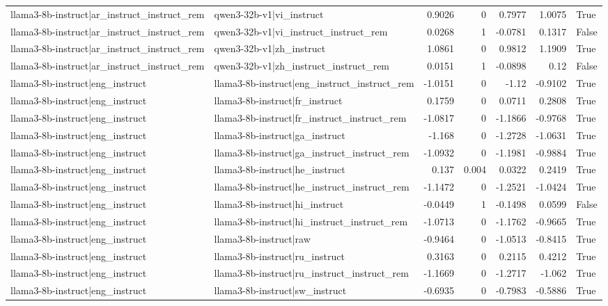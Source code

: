 \begin{table}
\begin{tabular}{l l r r r r l}
llama3-8b-instruct|ar_instruct_instruct_rem & qwen3-32b-v1|vi_instruct & 0.9026 & 0 & 0.7977 & 1.0075 & True \\
llama3-8b-instruct|ar_instruct_instruct_rem & qwen3-32b-v1|vi_instruct_instruct_rem & 0.0268 & 1 & -0.0781 & 0.1317 & False \\
llama3-8b-instruct|ar_instruct_instruct_rem & qwen3-32b-v1|zh_instruct & 1.0861 & 0 & 0.9812 & 1.1909 & True \\
llama3-8b-instruct|ar_instruct_instruct_rem & qwen3-32b-v1|zh_instruct_instruct_rem & 0.0151 & 1 & -0.0898 & 0.12 & False \\
llama3-8b-instruct|eng_instruct & llama3-8b-instruct|eng_instruct_instruct_rem & -1.0151 & 0 & -1.12 & -0.9102 & True \\
llama3-8b-instruct|eng_instruct & llama3-8b-instruct|fr_instruct & 0.1759 & 0 & 0.0711 & 0.2808 & True \\
llama3-8b-instruct|eng_instruct & llama3-8b-instruct|fr_instruct_instruct_rem & -1.0817 & 0 & -1.1866 & -0.9768 & True \\
llama3-8b-instruct|eng_instruct & llama3-8b-instruct|ga_instruct & -1.168 & 0 & -1.2728 & -1.0631 & True \\
llama3-8b-instruct|eng_instruct & llama3-8b-instruct|ga_instruct_instruct_rem & -1.0932 & 0 & -1.1981 & -0.9884 & True \\
llama3-8b-instruct|eng_instruct & llama3-8b-instruct|he_instruct & 0.137 & 0.004 & 0.0322 & 0.2419 & True \\
llama3-8b-instruct|eng_instruct & llama3-8b-instruct|he_instruct_instruct_rem & -1.1472 & 0 & -1.2521 & -1.0424 & True \\
llama3-8b-instruct|eng_instruct & llama3-8b-instruct|hi_instruct & -0.0449 & 1 & -0.1498 & 0.0599 & False \\
llama3-8b-instruct|eng_instruct & llama3-8b-instruct|hi_instruct_instruct_rem & -1.0713 & 0 & -1.1762 & -0.9665 & True \\
llama3-8b-instruct|eng_instruct & llama3-8b-instruct|raw & -0.9464 & 0 & -1.0513 & -0.8415 & True \\
llama3-8b-instruct|eng_instruct & llama3-8b-instruct|ru_instruct & 0.3163 & 0 & 0.2115 & 0.4212 & True \\
llama3-8b-instruct|eng_instruct & llama3-8b-instruct|ru_instruct_instruct_rem & -1.1669 & 0 & -1.2717 & -1.062 & True \\
llama3-8b-instruct|eng_instruct & llama3-8b-instruct|sw_instruct & -0.6935 & 0 & -0.7983 & -0.5886 & True \\

\end{tabular}
\end{table}
